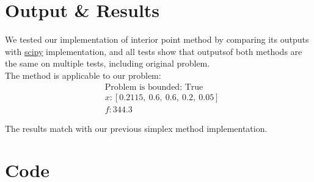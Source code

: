 \documentclass{article}
\begin{document}
\section{Output \& Results}
We tested our implementation of interior point method by comparing its outputs
with \href{https://scipy.org}{scipy} implementation, and all tests show that
outputsof both methods are the same on multiple tests, including original
problem. \\ The method is applicable to our problem:
\begin{align*}
     & \text{Problem is bounded: True}          \\
     & x: [0.2115, \ 0.6, \ 0.6, \ 0.2, \ 0.05] \\
     & f: 344.3
\end{align*}

The results match with our previous simplex method implementation.

\section{Code}
\end{document}
